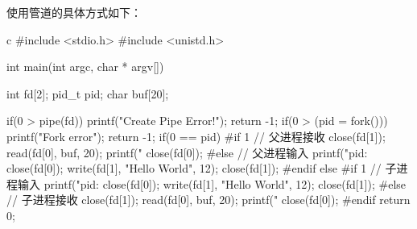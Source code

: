使用管道的具体方式如下：
\begin{code-block}{c}
#include <stdio.h>
#include <unistd.h>

int main(int argc, char * argv[])
{
        int fd[2];
        pid_t pid;
        char buf[20];

        if(0 > pipe(fd))
        {
                printf("Create Pipe Error!\n");
                return -1;
        }
        if(0 > (pid = fork()))
        {
                printf("Fork error\n");
                return -1;
        }
        if(0 == pid)
        {
#if 1
                // 父进程接收
                close(fd[1]);
                read(fd[0], buf, 20);
                printf("%
                close(fd[0]);
#else
                // 父进程输入
                printf("pid: %
                close(fd[0]);
                write(fd[1], "Hello World\n", 12);
                close(fd[1]);
#endif
        }
        else{
#if 1
                // 子进程输入
                printf("pid: %
                close(fd[0]);
                write(fd[1], "Hello World\n", 12);
                close(fd[1]);
#else
                // 子进程接收
                close(fd[1]);
                read(fd[0], buf, 20);
                printf("%
                close(fd[0]);
#endif
        }
        return 0;
}
\end{code-block}

